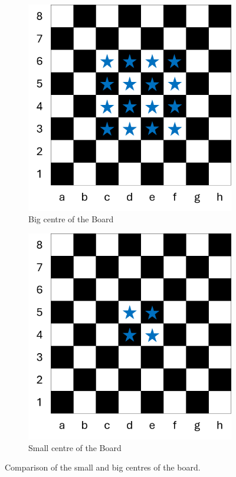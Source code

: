 \begin{figure}[h]
    \centering
    \begin{subfigure}[t]{0.4\textwidth}
        \centering
        \includegraphics[width=\textwidth]{images/bigCentre.png}
        \caption{Big centre of the Board}
        \label{fig:bigcentre}
    \end{subfigure}
    \hfill
    \begin{subfigure}[t]{0.4\textwidth}
        \centering
        \includegraphics[width=\textwidth]{images/smallCentre.png}
        \caption{Small centre of the Board}
        \label{fig:smallcentre}
    \end{subfigure}
    \caption{Comparison of the small and big centres of the board.}
    \label{fig:centres}
\end{figure}

